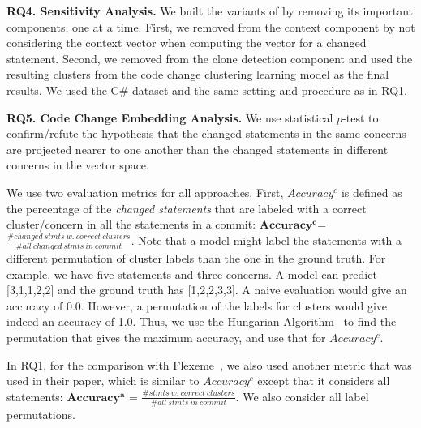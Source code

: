 \noindent\textbf{RQ4. Sensitivity Analysis.}
We built the variants of {\tool} by removing its important components,
one at a time. First, we removed from {\tool} the context component by
not considering the context vector when computing the vector
for a changed statement. Second, we removed from {\tool} the
clone detection component and used the resulting clusters from the
code change clustering learning model as the final results. We used the
C\# dataset and the same setting and procedure as in RQ1.


\noindent\textbf{RQ5. Code Change Embedding Analysis.}
We use statistical $p$-test to confirm/refute the hypothesis
that the changed statements in the same concerns are
projected nearer to one another than the changed statements in
different concerns in the vector space.




 We use two evaluation metrics for
all approaches. First, $Accuracy^{c}$ is defined as the percentage of
the {\em changed statements} that are labeled with a correct
cluster/concern in all the statements in a commit: $\mathbf{Accuracy^{c}}$=
$\frac{\# changed\:stmts\:w.\:correct\:clusters}{\#
all\:changed\:stmts\:in\:commit}$.  Note that a model might label the
statements with a different permutation of cluster labels than the one
in the ground truth. For example, we have five statements and three
concerns. A model can predict [3,1,1,2,2] and the ground truth has
[1,2,2,3,3]. A naive evaluation would give an accuracy of
0.0. However, a permutation of the labels for clusters would give
indeed an accuracy of 1.0. Thus, we use the Hungarian
Algorithm~\cite{hungarian-algo} to find the permutation that gives the
maximum accuracy, and use that for $Accuracy^{c}$.

In RQ1, for the comparison with Flexeme~\cite{flexeme-fse20}, we also
used another metric that was used in their paper, which is similar to
$Accuracy^{c}$ except that it considers all statements: $\mathbf{Accuracy^{a}}$
= $\frac{\# stmts\:w.\:correct\:clusters}{\# all\:stmts\:in\:commit}$.
We also consider all label permutations.

